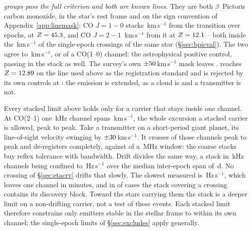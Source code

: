 \emph{\StkNSurvive{} groups pass the full criterion and both are known
lines.} They are both $\beta$~Pictoris carbon monoxide, in the star's rest
frame and on the sign convention of Appendix~\ref{app:linemask}: CO
$J=1\!-\!0$ stacks \StkBpCoOneOff\,km\,s$^{-1}$ from the transition over
\StkBpCoOneN{} epochs, at $Z=45.3$, and CO $J=2\!-\!1$
\StkBpCoTwoOff\,km\,s$^{-1}$ from it at $Z=12.1$ -- both inside the
\BpicDvCoHi\,km\,s$^{-1}$ of the single-epoch crossings of the same star
(\S\ref{sec:bpicval}). The two agree to \StkBpCrossKms\,km\,s$^{-1}$, or
\StkBpCrossChan{} of a CO(1--0) channel: the astrophysical positive control,
passing in the stack as well. The
survey's own $\pm50$\,km\,s$^{-1}$ mask leaves
\StkUnattrClause. \StkPersistLineStar{} reaches
$Z=12.89$ on the line used above as the registration standard and is
rejected by its own controls at \StkPersistLineCtrl: the emission is extended,
as a cloud is and a transmitter is not.

Every stacked limit above holds only for a carrier that stays inside one
channel. At CO(2--1) one \StkRefChanKHz\,kHz channel spans
\StkTolFineKms\,km\,s$^{-1}$, the whole excursion a stacked carrier is
allowed, peak to peak. Take a transmitter on a short-period giant planet, its line-of-sight
velocity swinging by $\pm30$\,km\,s$^{-1}$. It crosses
\SzReflexPPChanFine{} of those channels peak to peak and de-registers
completely, against \SzReflexPPChanCoarse{} of a \ChanBModeMHz\,MHz window:
the coarse stacks buy reflex tolerance with bandwidth. Drift divides the same way, a
stack in \StkRefChanKHz\,kHz channels being confined to
\StkDriftTolHzS\,Hz\,s$^{-1}$ over the median inter-epoch span of
\StkSpanMedD\,d. No crossing of \S\ref{sec:etacrv} drifts that slowly. The slowest measured
is \SttDriftMinHzS\,Hz\,s$^{-1}$, which leaves one channel in
\SttDriftMinMin{} minutes, and in \SttNIncDisc{} of \NUnattributed{} cases
the stack covering a crossing contains its discovery block. Toward the
\SttNHostStar{} stars carrying them the stack is a deeper limit on a
non-drifting carrier, not a test of these events. Each
stacked limit therefore constrains only emitters stable in the stellar frame to
within its own channel; the single-epoch limits of \S\ref{sec:excludes} apply
generally.
